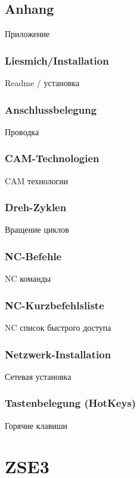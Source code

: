 \documentclass[12pt,a4paper]{book}
\begin{document}
\chapter{Anhang}{Приложение}
	\section{Liesmich/Installation}{Readme / установка}
	\section{Anschlussbelegung}{Проводка}
	\section{CAM-Technologien}{CAM технологии}
	\section{Dreh-Zyklen}{Вращение циклов}
	\section{NC-Befehle}{NC команды}
	\section{NC-Kurzbefehlsliste}{NC список быстрого доступа}
	\section{Netzwerk-Installation}{Сетевая установка}
	\section{Tastenbelegung (HotKeys)}{Горячие клавиши}


\part{ZSE3}
\end{document}
